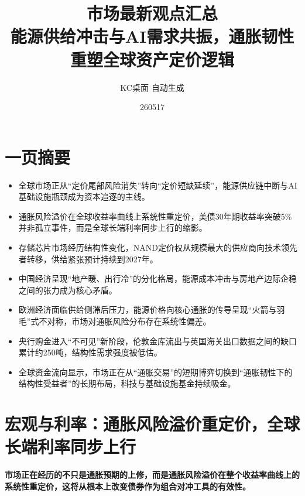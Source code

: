 \documentclass[11pt]{ctexart}
\title{\textbf{市场最新观点汇总}\\[0.4em]{\large 能源供给冲击与AI需求共振，通胀韧性重塑全球资产定价逻辑}}
\author{KC桌面 自动生成}
\date{260517}
\begin{document}
\maketitle
\section*{一页摘要}
\begin{itemize}
  \item 全球市场正从“定价尾部风险消失”转向“定价短缺延续”，能源供应链中断与AI基础设施瓶颈成为资本追逐的主线。
  \item 通胀风险溢价在全球收益率曲线上系统性重定价，美债30年期收益率突破5\%并非孤立事件，而是全球长端利率同步上行的缩影。
  \item 存储芯片市场经历结构性变化，NAND定价权从规模最大的供应商向技术领先者转移，供给紧张预计持续到2027年。
  \item 中国经济呈现“地产暖、出行冷”的分化格局，能源成本冲击与房地产边际企稳之间的张力成为核心矛盾。
  \item 欧洲经济面临供给侧滞后压力，能源价格向核心通胀的传导呈现“火箭与羽毛”式不对称，市场对通胀风险分布存在系统性偏差。
  \item 央行购金进入“不可见”新阶段，伦敦金库流出与英国海关出口数据之间的缺口累计约250吨，结构性需求强度被低估。
  \item 全球资金流向显示，市场正在从“通胀交易”的短期博弈切换到“通胀韧性下的结构性受益者”的长期布局，科技与基础设施基金持续吸金。
\end{itemize}
\section{宏观与利率：通胀风险溢价重定价，全球长端利率同步上行}
\textbf{市场正在经历的不只是通胀预期的上修，而是通胀风险溢价在整个收益率曲线上的系统性重定价，这将从根本上改变债券作为组合对冲工具的有效性。}
\end{document}

